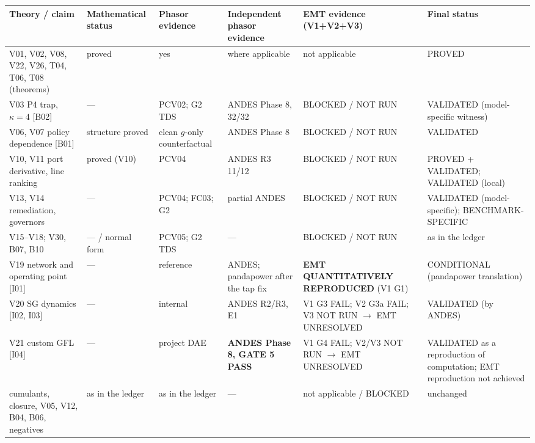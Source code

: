 \documentclass[10pt,a4paper]{article}
\begin{document}
{\footnotesize
\begin{longtable}{@{}L{3.0cm}L{1.5cm}L{2.0cm}L{2.2cm}L{3.3cm}L{2.8cm}@{}}
\toprule
Theory / claim & Mathem\-atical status & Phasor evidence & Independent phasor evidence & EMT evidence (V1+V2+V3) & Final status\\
\midrule\endhead
V01, V02, V08, V22, V26, T04, T06, T08 (theorems) & proved & yes & where applicable & not applicable & PROVED\\
V03 P4 trap, $\kappa=4$ [B02] & --- & PCV02; G2 TDS & ANDES Phase 8, 32/32 & BLOCKED / NOT RUN & VALIDATED (model-specific witness)\\
V06, V07 policy dependence [B01] & structure proved & clean $g$-only counterfactual & ANDES Phase 8 & BLOCKED / NOT RUN & VALIDATED\\
V10, V11 port derivative, line ranking & proved (V10) & PCV04 & ANDES R3 11/12 & BLOCKED / NOT RUN & PROVED + VALIDATED; VALIDATED (local)\\
V13, V14 remediation, governors & --- & PCV04; FC03; G2 & partial ANDES & BLOCKED / NOT RUN & VALIDATED (model-specific); BENCHMARK-SPECIFIC\\
V15--V18; V30, B07, B10 & --- / normal form & PCV05; G2 TDS & --- & BLOCKED / NOT RUN & as in the ledger\\
V19 network and operating point [I01] & --- & reference & ANDES; pandapower after the tap fix & \textbf{EMT QUANTITATIVELY REPRODUCED} (V1 G1) & CONDITIONAL (pandapower translation)\\
V20 SG dynamics [I02, I03] & --- & internal & ANDES R2/R3, E1 & V1 G3 FAIL; V2 G3a FAIL; V3 NOT RUN $\to$ EMT UNRESOLVED & VALIDATED (by ANDES)\\
V21 custom GFL [I04] & --- & project DAE & \textbf{ANDES Phase 8, GATE 5 PASS} & V1 G4 FAIL; V2/V3 NOT RUN $\to$ EMT UNRESOLVED & VALIDATED as a reproduction of computation; EMT reproduction not achieved\\
cumulants, closure, V05, V12, B04, B06, negatives & as in the ledger & as in the ledger & --- & not applicable / BLOCKED & unchanged\\
\bottomrule
\end{longtable}}
\end{document}
